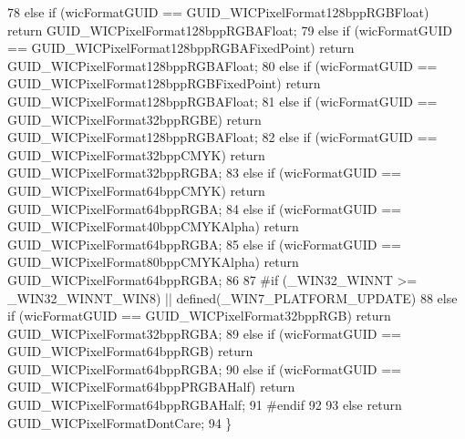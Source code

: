 \begin{DoxyCode}
78     \textcolor{keywordflow}{else} \textcolor{keywordflow}{if} (wicFormatGUID == GUID\_WICPixelFormat128bppRGBFloat) \textcolor{keywordflow}{return} GUID\_WICPixelFormat128bppRGBAFloat;
79     \textcolor{keywordflow}{else} \textcolor{keywordflow}{if} (wicFormatGUID == GUID\_WICPixelFormat128bppRGBAFixedPoint) \textcolor{keywordflow}{return} 
      GUID\_WICPixelFormat128bppRGBAFloat;
80     \textcolor{keywordflow}{else} \textcolor{keywordflow}{if} (wicFormatGUID == GUID\_WICPixelFormat128bppRGBFixedPoint) \textcolor{keywordflow}{return} 
      GUID\_WICPixelFormat128bppRGBAFloat;
81     \textcolor{keywordflow}{else} \textcolor{keywordflow}{if} (wicFormatGUID == GUID\_WICPixelFormat32bppRGBE) \textcolor{keywordflow}{return} GUID\_WICPixelFormat128bppRGBAFloat;
82     \textcolor{keywordflow}{else} \textcolor{keywordflow}{if} (wicFormatGUID == GUID\_WICPixelFormat32bppCMYK) \textcolor{keywordflow}{return} GUID\_WICPixelFormat32bppRGBA;
83     \textcolor{keywordflow}{else} \textcolor{keywordflow}{if} (wicFormatGUID == GUID\_WICPixelFormat64bppCMYK) \textcolor{keywordflow}{return} GUID\_WICPixelFormat64bppRGBA;
84     \textcolor{keywordflow}{else} \textcolor{keywordflow}{if} (wicFormatGUID == GUID\_WICPixelFormat40bppCMYKAlpha) \textcolor{keywordflow}{return} GUID\_WICPixelFormat64bppRGBA;
85     \textcolor{keywordflow}{else} \textcolor{keywordflow}{if} (wicFormatGUID == GUID\_WICPixelFormat80bppCMYKAlpha) \textcolor{keywordflow}{return} GUID\_WICPixelFormat64bppRGBA;
86 
87 \textcolor{preprocessor}{#if (\_WIN32\_WINNT >= \_WIN32\_WINNT\_WIN8) || defined(\_WIN7\_PLATFORM\_UPDATE)}
88     \textcolor{keywordflow}{else} \textcolor{keywordflow}{if} (wicFormatGUID == GUID\_WICPixelFormat32bppRGB) \textcolor{keywordflow}{return} GUID\_WICPixelFormat32bppRGBA;
89     \textcolor{keywordflow}{else} \textcolor{keywordflow}{if} (wicFormatGUID == GUID\_WICPixelFormat64bppRGB) \textcolor{keywordflow}{return} GUID\_WICPixelFormat64bppRGBA;
90     \textcolor{keywordflow}{else} \textcolor{keywordflow}{if} (wicFormatGUID == GUID\_WICPixelFormat64bppPRGBAHalf) \textcolor{keywordflow}{return} GUID\_WICPixelFormat64bppRGBAHalf;
91 \textcolor{preprocessor}{#endif}
92 
93     \textcolor{keywordflow}{else} \textcolor{keywordflow}{return} GUID\_WICPixelFormatDontCare;
94 \}
\end{DoxyCode}
\mbox{\label{class_texture_loader_a32ad2663545df2f57f794d617429ebd1}} 
